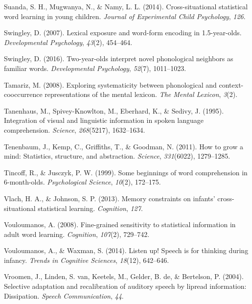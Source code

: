 \documentclass[english,,man,floatsintext]{apa6}
\theoremstyle{definition}
\theoremstyle{definition}
\theoremstyle{definition}
\theoremstyle{remark}
\begin{document}
\hypertarget{ref-suanda2014}{}
Suanda, S. H., Mugwanya, N., \& Namy, L. L. (2014). Cross-situational
statistical word learning in young children. \emph{Journal of
Experimental Child Psychology}, \emph{126}.

\hypertarget{ref-Swingley2007}{}
Swingley, D. (2007). Lexical exposure and word-form encoding in
1.5-year-olds. \emph{Developmental Psychology}, \emph{43}(2), 454--464.

\hypertarget{ref-Swingley2016}{}
Swingley, D. (2016). Two-year-olds interpret novel phonological
neighbors as familiar words. \emph{Developmental Psychology},
\emph{52}(7), 1011--1023.

\hypertarget{ref-Tamariz2008}{}
Tamariz, M. (2008). Exploring systematicity between phonological and
context-cooccurrence representations of the mental lexicon. \emph{The
Mental Lexicon}, \emph{3}(2).

\hypertarget{ref-Tanenhaus1995}{}
Tanenhaus, M., Spivey-Knowlton, M., Eberhard, K., \& Sedivy, J. (1995).
Integration of visual and linguistic information in spoken language
comprehension. \emph{Science}, \emph{268}(5217), 1632--1634.

\hypertarget{ref-tenenbaum11}{}
Tenenbaum, J., Kemp, C., Griffiths, T., \& Goodman, N. (2011). How to
grow a mind: Statistics, structure, and abstraction. \emph{Science},
\emph{331}(6022), 1279--1285.

\hypertarget{ref-tincoff1999}{}
Tincoff, R., \& Jusczyk, P. W. (1999). Some beginnings of word
comprehension in 6-month-olds. \emph{Psychological Science},
\emph{10}(2), 172--175.

\hypertarget{ref-vlach2013}{}
Vlach, H. A., \& Johnson, S. P. (2013). Memory constraints on infants'
cross-situational statistical learning. \emph{Cognition}, \emph{127}.

\hypertarget{ref-vouloumanos2008}{}
Vouloumanos, A. (2008). Fine-grained sensitivity to statistical
information in adult word learning. \emph{Cognition}, \emph{107}(2),
729--742.

\hypertarget{ref-vouloumanos2014}{}
Vouloumanos, A., \& Waxman, S. (2014). Listen up! Speech is for thinking
during infancy. \emph{Trends in Cognitive Sciences}, \emph{18}(12),
642--646.

\hypertarget{ref-vroomen2004}{}
Vroomen, J., Linden, S. van, Keetels, M., Gelder, B. de, \& Bertelson,
P. (2004). Selective adaptation and recalibration of auditory speech by
lipread information: Dissipation. \emph{Speech Communication},
\emph{44}.
\end{document}

